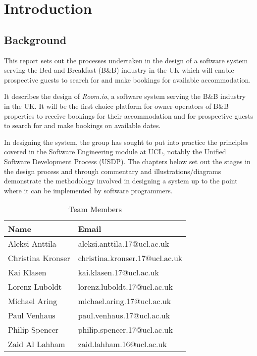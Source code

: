 \chapter{Introduction}
\label{introduction}

\section{Background}

This report sets out the processes undertaken in the design of a software system serving the Bed and Breakfast (B\&B) industry in the UK which will enable prospective guests to search for and make bookings for available accommodation.

It describes the design of \textit{Room.io}, a software system serving the B\&B industry in the UK. It will be the first choice platform for owner-operators of B\&B properties to receive bookings for their accommodation and for prospective guests to search for and make bookings on available dates.

In designing the system, the group has sought to put into practice the principles covered in the Software Engineering module at UCL, notably the Unified Software Development Process (USDP). The chapters below set out the stages in the design process and through commentary and illustrations/diagrams demonstrate the methodology involved in designing a system up to the point where it can be implemented by software programmers.

\begin{table}[H]
    \centering
    \label{team_members}
    \begin{tabular}{| l | l |}
      \hline
        \rowcolor{lightgray} \textbf{Name} & \textbf{Email} \\ \hline
        Aleksi Anttila        & aleksi.anttila.17@ucl.ac.uk     \\ \hline
        Christina Kronser     & christina.kronser.17@ucl.ac.uk  \\ \hline
        Kai Klasen            & kai.klasen.17@ucl.ac.uk         \\ \hline
        Lorenz Luboldt	      & lorenz.luboldt.17@ucl.ac.uk     \\ \hline
        Michael Aring	      & michael.aring.17@ucl.ac.uk      \\ \hline
        Paul Venhaus	      & paul.venhaus.17@ucl.ac.uk       \\ \hline
        Philip Spencer	      & philip.spencer.17@ucl.ac.uk     \\ \hline
        Zaid Al Lahham	      & zaid.lahham.16@ucl.ac.uk        \\ \hline
    \end{tabular}
    \caption{Team Members}
\end{table}

